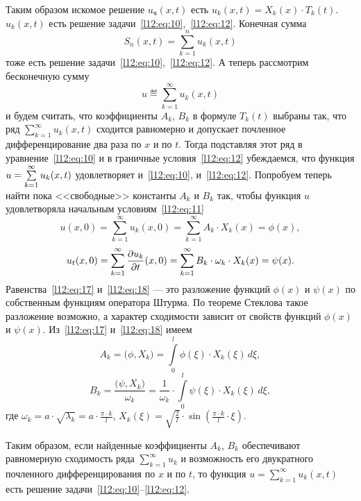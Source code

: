 Таким образом искомое решение $u_{\text{ч}}(x,t)$ есть $u_k(x,t)=X_k(x)\cdot T_k(t)$. $u_k(x,t)$ есть решение задачи~\eqref{l12:eq:10},~\eqref{l12:eq:12}. Конечная сумма 
\begin{equation*}
	 S_n(x,t)=\sum\limits_{k=1}^n u_k(x,t) 
\end{equation*}
тоже есть решение задачи~\eqref{l12:eq:10},~\eqref{l12:eq:12}. А теперь рассмотрим бесконечную сумму 
\begin{equation*}
	 u\eqdef\sum\limits_{k=1}^{\infty}u_k(x,t)
\end{equation*}
и будем считать, что коэффициенты $A_k$, $B_k$ в формуле $T_k(t)$ выбраны так, что ряд $\sum\limits_{k=1}^{\infty}u_k(x,t)$ сходится равномерно и допускает почленное дифференцирование два раза по $x$ и по $t$. Тогда подставляя этот ряд в уравнение~\eqref{l12:eq:10} и в граничные условия~\eqref{l12:eq:12} убеждаемся, что функция $u\?=\sum\limits_{k=1}^{\infty}u_k(x,t)$ удовлетворяет и~\eqref{l12:eq:10}, и~\eqref{l12:eq:12}. Попробуем теперь найти пока <<свободные>> константы $A_k$ и $B_k$ так, чтобы функция $u$ удовлетворяла начальным условиям~\eqref{l12:eq:11}
\begin{equation}
	\label{l12:eq:17}
	 u(x,0)=\sum\limits_{k=1}^{\infty}u_k(x,0)=\sum\limits_{k=1}^{\infty}A_k\cdot X_k(x)=\phi(x),
\end{equation}
\begin{equation}
	\label{l12:eq:18}
	 u_t(x,0)=\sum\limits_{k=1}^{\infty}\frac{\partial u_k}{\partial t}(x,0)=\sum\limits_{k=1}^{\infty}B_k\cdot\omega_k\cdot X_k(x)=\psi(x).
\end{equation}
Равенства~\eqref{l12:eq:17} и~\eqref{l12:eq:18} --- это разложение функций $\phi(x)$ и $\psi(x)$ по собственным функциям оператора Штурма. По теореме Стеклова такое разложение возможно, а характер сходимости зависит от свойств функций $\phi(x)$ и $\psi(x)$. Из~\eqref{l12:eq:17} и~\eqref{l12:eq:18} имеем 
\begin{equation*}
	 A_k=\big(\phi,X_k\big)=\int\limits_0^l\phi(\xi)\cdot X_k(\xi)\,d\xi,
\end{equation*}
\begin{equation*}
	 B_k=\frac{\big(\psi,X_k\big)}{\omega_k}=\frac{1}{\omega_k}\cdot\int\limits_0^l\psi(\xi)\cdot X_k(\xi)\,d\xi,
\end{equation*}
где $\displaystyle\omega_k=a\cdot\sqrt{\lambda_k}=a\cdot\frac{\pi\cdot k}{l}$, $\displaystyle  X_k(\xi)=\sqrt{\frac{2}{l}}\cdot\sin\left(\frac{\pi\cdot k}{l}\cdot\xi\right)$.

Таким образом, если найденные коэффициенты $A_k$, $B_k$ обеспечивают равномерную сходимость ряда $\sum\limits_{k=1}^{\infty}u_k$ и возможность его двукратного почленного дифференцирования по $x$ и по $t$, то функция $u=\sum\limits_{k=1}^{\infty}u_k(x,t)$ есть решение задачи~\eqref{l12:eq:10}--\eqref{l12:eq:12}. 

